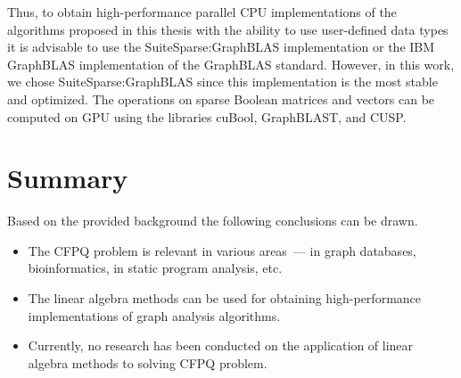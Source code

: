 Thus, to obtain high-performance parallel CPU implementations of the algorithms proposed in this thesis with the ability to use user-defined data types it is advisable to use the SuiteSparse:GraphBLAS implementation or the IBM GraphBLAS implementation of the GraphBLAS standard. However, in this work, we chose SuiteSparse:GraphBLAS since this implementation is the most stable and optimized. The operations on sparse Boolean matrices and vectors can be computed on GPU using the libraries cuBool, GraphBLAST, and CUSP.







\section{Summary}\label{sec:ch1/sec8}
Based on the provided background the following conclusions can be drawn.
\begin{itemize}
	\item The CFPQ problem is relevant in various areas~--- in graph databases, bioinformatics, in static program analysis, etc.
	
	\item The linear algebra methods can be used for obtaining high-performance implementations of graph analysis algorithms.

	\item Currently, no research has been conducted on the application of linear algebra methods to solving CFPQ problem.
\end{itemize}

